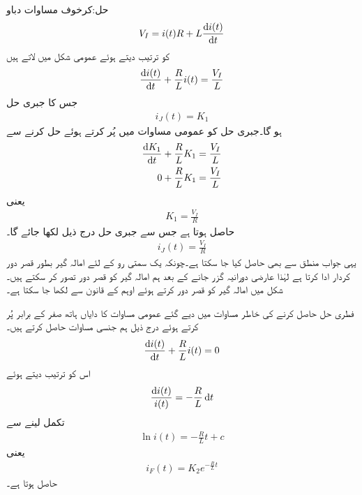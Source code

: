 حل:کرخوف مساوات دباو
\begin{align*}
V_I=i(t)R+L\frac{\dif i(t)}{\dif t}
\end{align*}
کو ترتیب دیتے ہوئے عمومی شکل میں لاتے ہیں
\begin{align}\label{مساوات_عارضی_امالہ_گیر_عمومی_الف}
\frac{\dif i(t)}{\dif t}+\frac{R}{L} i(t)=\frac{V_I}{L}
\end{align}
جس کا جبری حل
\begin{align*}
i_J(t)=K_1
\end{align*}
ہو گا۔جبری حل کو عمومی مساوات میں پُر کرتے ہوئے حل کرنے سے
\begin{align*}
\frac{\dif K_1}{\dif t}+\frac{R}{L} K_1&=\frac{V_I}{L}\\
0+\frac{R}{L} K_1&=\frac{V_I}{L}
\end{align*}
یعنی
\begin{align*}
K_1=\frac{V_I}{R}
\end{align*}
حاصل ہوتا ہے جس سے جبری حل درج ذیل لکھا جائے گا۔
\begin{align*}
i_J(t)=\frac{V_I}{R}
\end{align*}
یہی جواب منطق سے بھی حاصل کیا جا سکتا ہے۔چونکہ  یک سمتی رو کے لئے امالہ گیر بطور قصر دور کردار ادا کرتا ہے لہٰذا عارضی دورانیہ گزر جانے کے بعد ہم امالہ گیر کو قصر دور تصور کر سکتے ہیں۔شکل  میں امالہ گیر کو قصر دور کرتے ہوئے اوہم کے قانون سے  لکھا جا سکتا ہے۔

فطری حل حاصل کرنے کی خاطر مساوات  میں دیے گئے عمومی مساوات کا دایاں ہاتھ صفر کے برابر پُر کرتے ہوئے درج ذیل ہم جنسی مساوات حاصل کرتے ہیں۔
\begin{align*}
\frac{\dif i(t)}{\dif t}+\frac{R}{L} i(t)=0
\end{align*}
اس کو ترتیب دیتے ہوئے
\begin{align*}
\frac{\dif i(t)}{i(t)}=-\frac{R}{L} \dif t
\end{align*}
تکمل لینے سے
\begin{align*}
\ln i(t)=-\frac{R}{L}t +c
\end{align*}
یعنی
\begin{align*}
i_F(t)=K_2e^{-\frac{R}{L}t}
\end{align*}
حاصل ہوتا ہے۔

